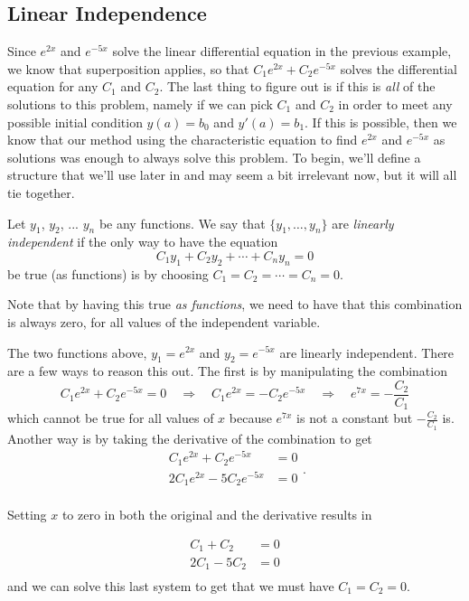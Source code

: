 \subsection{Linear Independence}

Since $e^{2x}$ and $e^{-5x}$ solve the linear differential equation in the previous example, we know that superposition applies, so that $C_1e^{2x} + C_2e^{-5x}$ solves the differential equation for any $C_1$ and $C_2$. The last thing to figure out is if this is \emph{all} of the solutions to this problem, namely if we can pick $C_1$ and $C_2$ in order to meet any possible initial condition $y(a) = b_0$ and $y'(a) = b_1$. If this is possible, then we know that our method using the characteristic equation to find $e^{2x}$ and $e^{-5x}$ as solutions was enough to always solve this problem. To begin, we'll define a structure that we'll use later in  and may seem a bit irrelevant now, but it will all tie together.

\begin{definition}
Let $y_1$, $y_2$, ... $y_n$ be any functions. We say that $\{ y_1, \ldots,  y_n\}$ are \emph{linearly independent} if the only way to have the equation \[ C_1y_1 + C_2y_2 + \cdots + C_ny_n = 0 \] be true (as functions) is by choosing $C_1 = C_2 = \cdots = C_n = 0$. 
\end{definition}

Note that by having this true \emph{as functions}, we need to have that this combination is always zero, for all values of the independent variable. 

\begin{example}
The two functions above, $y_1 = e^{2x}$ and $y_2 = e^{-5x}$ are linearly independent. There are a few ways to reason this out. The first is by manipulating the combination
\begin{equation*}
C_1e^{2x} + C_2e^{-5x} = 0 \quad \Rightarrow \quad C_1e^{2x} = -C_2e^{-5x} \quad \Rightarrow \quad e^{7x} = -\frac{C_2}{C_1} 
\end{equation*}
which cannot be true for all values of $x$ because $e^{7x}$ is not a constant but $-\frac{C_2}{C_1}$ is. Another way is by taking the derivative of the combination to get
\begin{equation*}
\begin{split}
C_1e^{2x} + C_2e^{-5x} &= 0 \\
2C_1e^{2x} - 5C_2e^{-5x} &= 0\\
\end{split}.
\end{equation*}

Setting $x$ to zero in both the original and the derivative results in 

\begin{equation*}
\begin{split}
C_1 + C_2 &= 0\\
2C_1 - 5C_2 &= 0\\
\end{split}
\end{equation*}
and we can solve this last system to get that we must have $C_1 = C_2 = 0$. 
\end{example}

